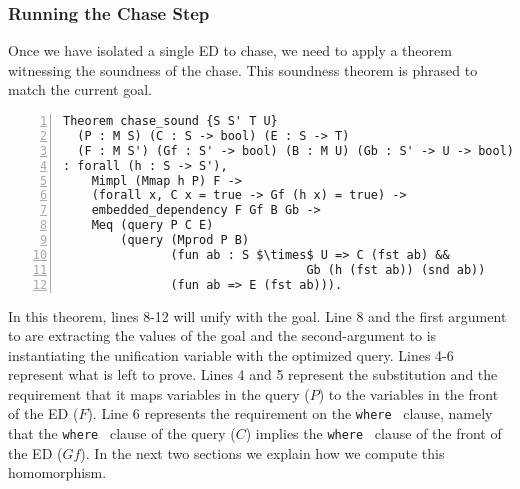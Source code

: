 \documentclass[preprint]{sigplanconf}
\newcommand{\WHERE}{{\tt where} \ }
\begin{document}

\subsubsection{Running the Chase Step}
\label{sec:chase-step}

Once we have isolated a single ED to chase, we need to apply a theorem witnessing the soundness of the chase.
This soundness theorem is phrased to match the current goal.
\begin{lstlisting}[numbers=left]
Theorem chase_sound {S S' T U}
  (P : M S) (C : S -> bool) (E : S -> T)
  (F : M S') (Gf : S' -> bool) (B : M U) (Gb : S' -> U -> bool)
: forall (h : S -> S'),
    Mimpl (Mmap h P) F ->
    (forall x, C x = true -> Gf (h x) = true) ->
    embedded_dependency F Gf B Gb ->
    Meq (query P C E)
        (query (Mprod P B)
               (fun ab : S $\times$ U => C (fst ab) &&
                                  Gb (h (fst ab)) (snd ab))
               (fun ab => E (fst ab))).
\end{lstlisting}
In this theorem, lines 8-12 will unify with the goal.
Line 8 and the first argument to  are extracting the values of the goal and the second-argument to  is instantiating the unification variable with the optimized query.
Lines 4-6 represent what is left to prove.
Lines 4 and 5 represent the substitution and the requirement that it maps variables in the query ($P$) to the variables in the front of the ED ($F$).
Line 6 represents the requirement on the \WHERE clause, namely that the \WHERE clause of the query ($C$) implies the \WHERE clause of the front of the ED ($Gf$).
In the next two sections we explain how we compute this homomorphism.
\end{document}
